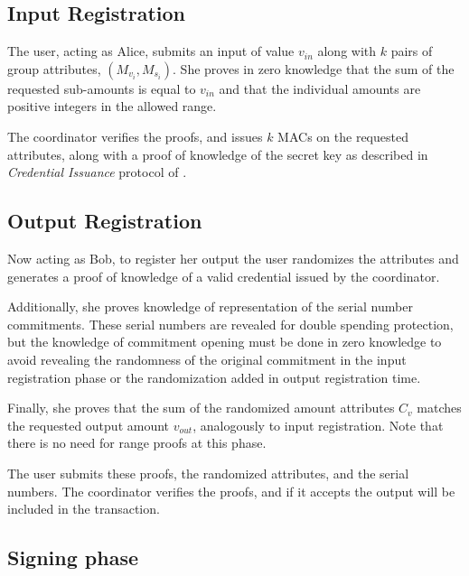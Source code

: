 \documentclass{article}
\begin{document}
\subsection{Input Registration} 

The user, acting as Alice, submits an input of value $v_{\mathit{in}}$ along with $k$ pairs of group attributes,
$(M_{v_i}, M_{s_i})$.
She proves in zero knowledge that the sum of the requested sub-amounts is equal to $v_{\mathit{in}}$ and that the individual amounts are positive integers in the allowed range.


The coordinator verifies the proofs, and issues $k$ MACs on the requested attributes, along with a proof of knowledge of the secret key as described in \textit{Credential Issuance} protocol of \cite{chase2019signal}.

\subsection{Output Registration}

Now acting as Bob, to register her output the user randomizes the attributes and generates a proof of knowledge of a valid credential issued by the coordinator.

Additionally, she proves knowledge of representation of the serial number commitments. These serial numbers are revealed for double spending protection, but the knowledge of commitment opening must be done in zero knowledge to avoid revealing the randomness of the original commitment in the input registration phase or the randomization added in output registration time.

Finally, she proves that the sum of the randomized amount attributes $C_v$ matches the requested output amount $v_{\mathit{out}}$, analogously to input registration. Note that there is no need for range proofs at this phase.

The user submits these proofs, the randomized attributes, and the serial numbers. The coordinator verifies the proofs, and if it accepts the output will be included in the transaction.

\subsection{Signing phase}
\end{document}
